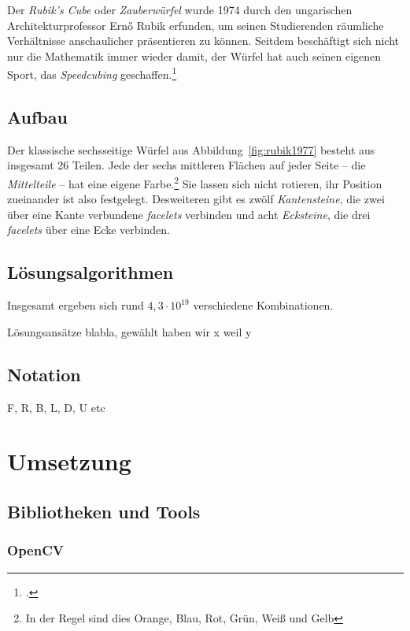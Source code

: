 Der \emph{Rubik's Cube} oder \emph{Zauberwürfel} wurde 1974 durch den
ungarischen Architekturprofessor Ernő Rubik erfunden, um seinen Studierenden
räumliche Verhältnisse anschaulicher präsentieren zu können. Seitdem beschäftigt
sich nicht nur die Mathematik immer wieder damit, der Würfel hat auch seinen
eigenen Sport, das \emph{Speedcubing} geschaffen.\footcite{rubik:history} 

\subsection{Aufbau}  %

Der klassische sechsseitige Würfel aus Abbildung~\ref{fig:rubik1977} besteht aus
insgesamt 26 Teilen. Jede der sechs mittleren Flächen auf jeder Seite – die
\emph{Mittelteile} – hat eine eigene Farbe.\footnote{In der Regel sind dies
Orange, Blau, Rot, Grün, Weiß und Gelb} Sie lassen sich nicht rotieren, ihr
Position zueinander ist also festgelegt. Desweiteren gibt es zwölf
\emph{Kantensteine}, die zwei über eine Kante verbundene \emph{facelets}
verbinden und acht \emph{Ecksteine}, die drei \emph{facelets} über eine Ecke
verbinden.

\subsection{Lösungsalgorithmen}  %

Insgesamt ergeben sich rund \( 4,3 \cdot {10}^{19} \) verschiedene
Kombinationen.

Lösungsansätze blabla, gewählt haben wir x weil y

\subsection{Notation}  %

F, R, B, L, D, U etc


\section{Umsetzung}  %

\subsection{Bibliotheken und Tools}  %
\subsubsection{OpenCV}  %
